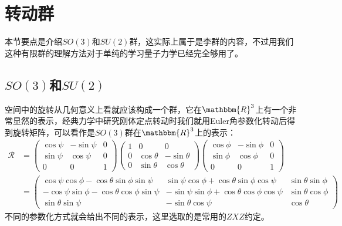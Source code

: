 \section{转动群}
本节要点是介绍$SO(3)$和$SU(2)$群，这实际上属于是李群的内容，不过用我们这种有限群的理解方法对于单纯的学习量子力学已经完全够用了。
\subsection{$SO(3)$和$SU(2)$}
空间中的旋转从几何意义上看就应该构成一个群，它在$\mathbbm{R}^3$上有一个非常显然的表示，经典力学中研究刚体定点转动时我们就用Euler角参数化转动后得到旋转矩阵，可以看作是$SO(3)$群在$\mathbbm{R}^3$上的表示：
\begin{equation}
	\label{eq:D.4.27}
	\begin{aligned}
		\mathcal{R}&=\left( {\begin{array}{*{20}{c}}
				{\cos \psi }&{ - \sin \psi }&0 \\ 
				{\sin \psi }&{\cos \psi }&0 \\ 
				0&0&1 
		\end{array}} \right)\left( {\begin{array}{*{20}{c}}
				1&0&0 \\ 
				0&{\cos \theta }&{ - \sin \theta } \\ 
				0&{\sin \theta }&{\cos \theta } 
		\end{array}} \right)\left( {\begin{array}{*{20}{c}}
				{\cos \phi }&{ - \sin \phi }&0 \\ 
				{\sin \phi }&{\cos \phi }&0 \\ 
				0&0&1 
		\end{array}} \right)\\
	&=\left( {\begin{array}{*{20}{c}}
			{\cos \psi \cos \phi  - \cos \theta \sin \phi \sin \psi }&{\sin \psi \cos \phi  + \cos \theta \sin \phi \cos \psi }&{\sin \theta \sin \phi } \\ 
			{ - \cos \psi \sin \phi  - \cos \theta \cos \phi \sin \psi }&{ - \sin \psi \sin \phi  + \cos \theta \cos \phi \cos \psi }&{\sin \theta \cos \phi } \\ 
			{\sin \theta \sin \psi }&{ - \sin \theta \cos \psi }&{\cos \theta } 
	\end{array}} \right)
	\end{aligned}
\end{equation}
不同的参数化方式就会给出不同的表示，这里选取的是常用的$ZXZ$约定。

